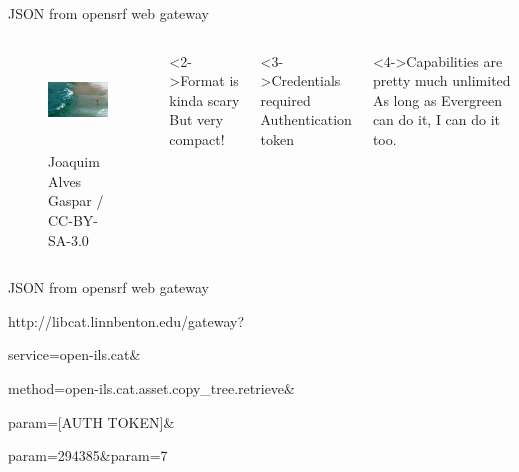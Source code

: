 \documentclass{beamer}
\begin{document}
\begin{frame}{JSON from opensrf web gateway}
 
 \begin{columns}
 \begin{figure}
  \begin{center}
   \includegraphics[height=1in]{opensrf.jpg}
   \caption{Joaquim Alves Gaspar / CC-BY-SA-3.0}
  \end{center}

 \end{figure}



\begin{block}<2->{Format is kinda scary}
But very compact!
\end{block}
\begin{block}<3->{Credentials required}
Authentication token
\end{block}
\begin{block}<4->{Capabilities are pretty much unlimited}
As long as Evergreen can do it, I can do it too.
\end{block}
\end{columns}


\end{frame}

\begin{frame}{JSON from opensrf web gateway}
 
 http://libcat.linnbenton.edu/gateway?
 
 service=open-ils.cat\&
 
 method=open-ils.cat.asset.copy\_tree.retrieve\&
 
 param=[AUTH TOKEN]\&
 
 param=294385\&param=7
 
\end{frame}

\renewcommand{\figurename}{How to get here}
\end{document}
